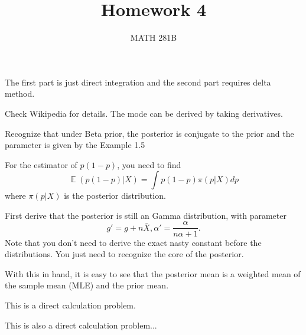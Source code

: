 \documentclass[12pt]{article}
\newcommand{\1}{\mathbbm{1}}
\newenvironment{exercise}[2][Exercise]{\begin{trivlist}
\item[\hskip \labelsep {\bfseries #1}\hskip \labelsep {\bfseries #2.}]}{\end{trivlist}}
\newcommand{\E}{\operatorname{\mathbb{E}}}
\begin{document}
\title{Homework 4}%
\author{MATH 281B} %
\maketitle
\begin{exercise}{6.9.1.13}
\end{exercise}

The first part is just direct integration and the second part requires delta method.

\begin{exercise}{4.8.1.2}
\end{exercise}

Check Wikipedia for details. The mode can be derived by taking derivatives.

\begin{exercise}{4.8.1.6}
\end{exercise}

Recognize that under Beta prior, the posterior is conjugate to the prior and the parameter is given by the Example 1.5

For the estimator of $p(1-p)$, you need to find
$$
\E (p(1-p) | X) = \int p (1-p) \pi (p |X) dp
$$
where $\pi(p|X)$ is the posterior distribution.

\begin{exercise}{4.8.1.9}
\end{exercise}

First derive that the posterior is still an Gamma distribution, with parameter 
$$
g' = g + n\bar{X}, \alpha'  = \frac{\alpha}{n\alpha +1}.
$$
Note that you don't need to derive the exact nasty constant before the distributions. You just need to recognize the core of the posterior.

With this in hand, it is easy to see that the posterior mean is a weighted mean of the sample mean (MLE) and the prior mean.

\begin{exercise}{5.8.1.9}
\end{exercise}

This is a direct calculation problem.

\begin{exercise}{5.8.1.10}
\end{exercise}

This is also a direct calculation problem...
\end{document}
